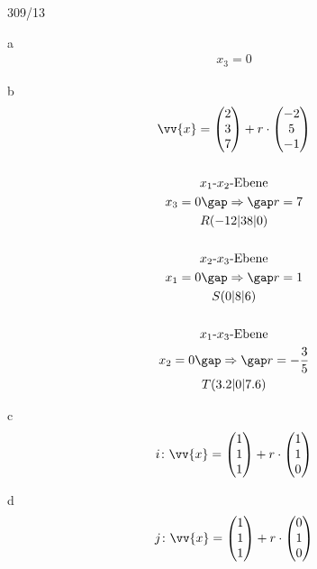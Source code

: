\begin{exercise}{309/13}
  \item [a]
  \begin{gather*}
    x_3 = 0
  \end{gather*}
  \item [b]
  \begin{gather*}
    \vv{x} = \begin{pmatrix}2 \\ 3 \\ 7\end{pmatrix} + r \cdot \begin{pmatrix}-2 \\ 5 \\ -1\end{pmatrix} \\\\
    \text{$x_1$-$x_2$-Ebene} \\
    x_3 = 0 \gap\Rightarrow\gap r = 7 \\
    R(-12|38|0) \\\\
    \text{$x_2$-$x_3$-Ebene} \\
    x_1 = 0 \gap\Rightarrow\gap r = 1 \\
    S(0|8|6) \\\\
    \text{$x_1$-$x_3$-Ebene} \\
    x_2 = 0 \gap\Rightarrow\gap r = -\frac{3}{5} \\
    T(3.2|0|7.6)
  \end{gather*}
  \item [c]
  \begin{gather*}
    i \colon \vv{x} = \begin{pmatrix}1 \\ 1 \\ 1\end{pmatrix} + r \cdot \begin{pmatrix}1 \\ 1 \\ 0\end{pmatrix}
  \end{gather*}
  \item [d]
  \begin{gather*}
    j \colon \vv{x} = \begin{pmatrix}1 \\ 1 \\ 1\end{pmatrix} + r \cdot \begin{pmatrix}0 \\ 1 \\ 0\end{pmatrix}
  \end{gather*}
\end{exercise}
\newpage
